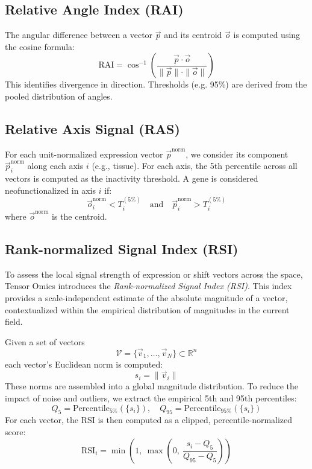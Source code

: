 \documentclass{article}
\begin{document}
\subsection{Relative Angle Index (RAI)}

The angular difference between a vector \( \vec{p} \) and its centroid \(
\vec{o} \) is computed using the cosine formula:
\[
  \text{RAI} = \cos^{-1} \left( \frac{\vec{p} \cdot \vec{o}}{\|\vec{p}\| \cdot \|\vec{o}\|} \right)
\]
This identifies divergence in direction. Thresholds (e.g. 95\%) are derived
from the pooled distribution of angles.

\subsection{Relative Axis Signal (RAS)}

 For each unit-normalized expression vector \( \vec{p}^{\text{norm}} \), we consider its component \( \vec{p}^{\text{norm}}_i \) along each axis \( i \) (e.g., tissue). For each axis, the 5th percentile across all vectors is computed as the inactivity threshold. A gene is considered neofunctionalized in axis \( i \) if:
    \[
    \vec{o}^{\text{norm}}_i < T_i^{(5\%)} \quad \text{and} \quad \vec{p}^{\text{norm}}_i > T_i^{(5\%)}
    \]
    where \( \vec{o}^{\text{norm}} \) is the centroid.

\subsection{Rank-normalized Signal Index (RSI)}
\label{sub:rsi}

To assess the local signal strength of expression or shift vectors across the space, Tensor Omics introduces the \emph{Rank-normalized Signal Index (RSI)}. This index provides a scale-independent estimate of the absolute magnitude of a vector, contextualized within the empirical distribution of magnitudes in the current field.

Given a set of vectors
\[
\mathcal{V} = \{ \vec{v}_1, \dots, \vec{v}_N \} \subset \mathbb{R}^n
\]
each vector's Euclidean norm is computed:
\[
s_i = \| \vec{v}_i \|
\]
These norms are assembled into a global magnitude distribution. To reduce the impact of noise and outliers, we extract the empirical 5th and 95th percentiles:
\[
Q_5 = \text{Percentile}_{5\%}(\{s_i\}), \quad Q_{95} = \text{Percentile}_{95\%}(\{s_i\})
\]
For each vector, the RSI is then computed as a clipped, percentile-normalized score:
\[
\text{RSI}_i = \min\left(1,\ \max\left(0,\ \frac{s_i - Q_5}{Q_{95} - Q_5}\right)\right)
\]
\end{document}
